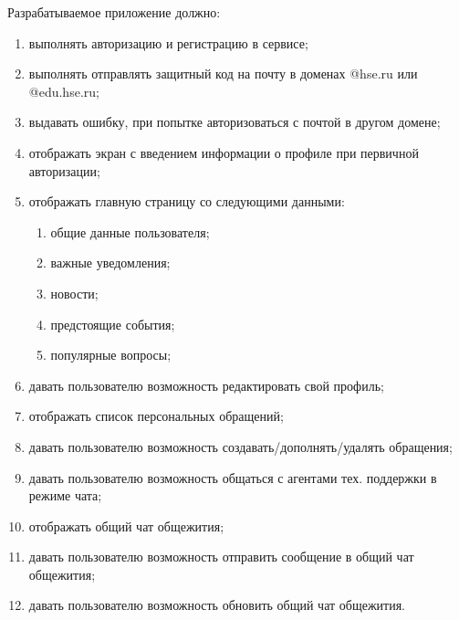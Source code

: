 Разрабатываемое приложение должно:

\begin{enumerate}
    \item выполнять авторизацию и регистрацию в сервисе;
    \item выполнять отправлять защитный код на почту в доменах @hse.ru или @edu.hse.ru;
    \item выдавать ошибку, при попытке авторизоваться с почтой в другом домене;
    \item отображать экран с введением информации о профиле при первичной авторизации;
    \item отображать главную страницу со следующими данными:
    \begin{enumerate}
        \item общие данные пользователя;
        \item важные уведомления;
        \item новости;
        \item предстоящие события;
        \item популярные вопросы;
    \end{enumerate}
    \item давать пользователю возможность редактировать свой профиль;
    \item отображать список персональных обращений;
    \item давать пользователю возможность создавать/дополнять/удалять обращения;
    \item давать пользователю возможность общаться с агентами тех. поддержки в режиме чата;
    \item отображать общий чат общежития;
    \item давать пользователю возможность отправить сообщение в общий чат общежития;
    \item давать пользователю возможность обновить общий чат общежития.
\end{enumerate}
